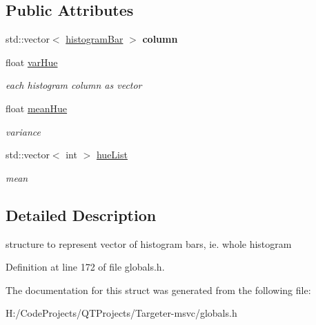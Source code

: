 \subsection*{Public Attributes}
\begin{DoxyCompactItemize}
\item 
\mbox{\label{structhist_cluster_af783140907cf13bc6bdfabfecd70311b}} 
std\+::vector$<$ \hyperlink{structhistogram_bar}{histogram\+Bar} $>$ {\bfseries column}
\item 
\mbox{\label{structhist_cluster_a9eda24704dde33b207b2fd5682b505ee}} 
float \hyperlink{structhist_cluster_a9eda24704dde33b207b2fd5682b505ee}{var\+Hue}
\begin{DoxyCompactList}\small\item\em each histogram column as vector \end{DoxyCompactList}\item 
\mbox{\label{structhist_cluster_af92ce9628948aec76afa20f7776caff2}} 
float \hyperlink{structhist_cluster_af92ce9628948aec76afa20f7776caff2}{mean\+Hue}
\begin{DoxyCompactList}\small\item\em variance \end{DoxyCompactList}\item 
\mbox{\label{structhist_cluster_a21a6b3ad886acdf8ab396ac5ec87875b}} 
std\+::vector$<$ int $>$ \hyperlink{structhist_cluster_a21a6b3ad886acdf8ab396ac5ec87875b}{hue\+List}
\begin{DoxyCompactList}\small\item\em mean \end{DoxyCompactList}\end{DoxyCompactItemize}


\subsection{Detailed Description}
structure to represent vector of histogram bars, ie. whole histogram 

Definition at line 172 of file globals.\+h.



The documentation for this struct was generated from the following file\+:\begin{DoxyCompactItemize}
\item 
H\+:/\+Code\+Projects/\+Q\+T\+Projects/\+Targeter-\/msvc/globals.\+h\end{DoxyCompactItemize}
